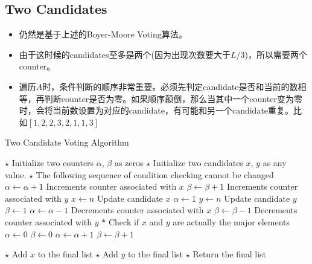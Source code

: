\subsection{Two Candidates}
\begin{CJK*}{UTF8}{gbsn}
\begin{itemize}
\item 仍然是基于上述的Boyer-Moore Voting算法。
\item 由于这时候的candidates至多是两个(因为出现次数要大于$L/3$)，所以需要两个counter。
\item 遍历$A$时，条件判断的顺序非常重要。必须先判定candidate是否和当前的数相等，再判断counter是否为零。如果顺序颠倒，那么当其中一个counter变为零时，会将当前数设置为对应的candidate，有可能和另一个candidate重复。比如$[1, 2, 2, 3, 2, 1, 1, 3]$
\end{itemize}
\end{CJK*}
\setcounter{algorithm}{0}
\begin{algorithm}[H]
\caption{Two Candidate Voting Algorithm}
\begin{algorithmic}[1]
\State $\star$ Initialize two counters $\alpha$, $\beta$ as zeros
\State $\star$ Initialize two candidates $x$, $y$ as any value.
\State $\star$ The following sequence of condition checking cannot be changed
\State $\alpha\gets\alpha+1$ \Comment Increments counter associated with $x$
\State $\beta\gets\beta+1$ \Comment Increments counter associated with $y$
\State $x\gets n$ \Comment Update candidate $x$
\State $\alpha\gets 1$
\State $y\gets n$ \Comment Update candidate $y$
\State $\beta\gets1$
\Else
\State $\alpha\gets\alpha-1$ \Comment Decrements counter associated with $x$
\State $\beta\gets\beta-1$ \Comment Decrements counter associated with $y$
\EndIf
\EndFor
\State $\ast$ Check if $x$ and $y$ are actually the major elements
\State $\alpha\gets 0$
\State $\beta\gets 0$
\State $\alpha\gets\alpha+1$
\State $\beta\gets\beta+1$
\end{algorithmic}
\end{algorithm}
\begin{algorithm}[H]
\begin{algorithmic}[1]
\EndIf
\EndFor
{}
\State $\star$ Add $x$ to the final list 
\EndIf
{}
\State $\star$ Add $y$ to the final list
\EndIf
\State $\star$ Return the final list
\EndProcedure
\end{algorithmic}
\end{algorithm}

